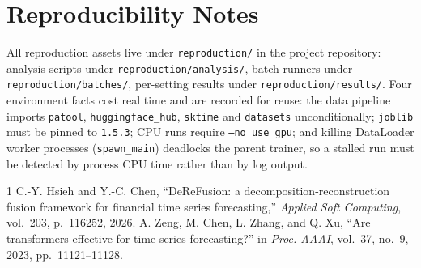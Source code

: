 \documentclass[conference]{IEEEtran}
\begin{document}
\section*{Reproducibility Notes}
All reproduction assets live under \texttt{reproduction/} in the project repository: analysis
scripts under \texttt{reproduction/analysis/}, batch runners under
\texttt{reproduction/batches/}, per-setting results under \texttt{reproduction/results/}. Four
environment facts cost real time and are recorded for reuse: the data pipeline imports
\texttt{patool}, \texttt{huggingface\_hub}, \texttt{sktime} and \texttt{datasets}
unconditionally; \texttt{joblib} must be pinned to \texttt{1.5.3}; CPU runs require
\texttt{--no\_use\_gpu}; and killing DataLoader worker processes (\texttt{spawn\_main})
deadlocks the parent trainer, so a stalled run must be detected by process CPU time rather than
by log output.

\begin{thebibliography}{1}
 C.-Y. Hsieh and Y.-C. Chen, ``DeReFusion: a decomposition-reconstruction
fusion framework for financial time series forecasting,'' \emph{Applied Soft Computing},
vol.~203, p.~116252, 2026.
 A. Zeng, M. Chen, L. Zhang, and Q. Xu, ``Are transformers effective for time
series forecasting?'' in \emph{Proc. AAAI}, vol.~37, no.~9, 2023, pp.~11121--11128.
\end{thebibliography}
\end{document}
